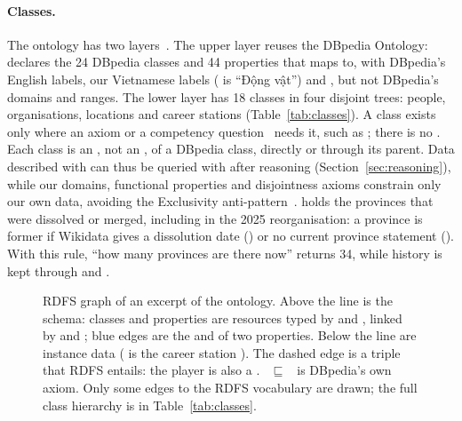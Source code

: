 \paragraph{Classes.} The ontology has two layers~\cite{heath2011linked}. The
upper layer reuses the DBpedia Ontology:  declares
the 24 DBpedia classes and 44 properties that  maps to, with
DBpedia's English labels, our Vietnamese labels ( is ``Động
vật'') and , but not DBpedia's domains and ranges.
The lower layer has 18  classes in four disjoint trees: people,
organisations, locations and career stations (Table~\ref{tab:classes}). A
 class exists only where an axiom or a competency
question~\cite{gruninger1995methodology} needs it, such as
; there is no . Each class is an
, not an , of a DBpedia class,
directly or through its parent. Data described with  can thus be
queried with  after reasoning (Section~\ref{sec:reasoning}), while
our domains, functional properties and disjointness axioms constrain only our
own data, avoiding the Exclusivity anti-pattern~\cite{paulheim2024modeling}.
 holds the
provinces that were dissolved or merged, including in the 2025 reorganisation:
a province is former if Wikidata gives a dissolution date () or no
current province statement (). With this rule, ``how many provinces are there now'' returns
34, while history is kept through  and
.

\begin{figure}[t]
\centering
\resizebox{\textwidth}{!}{}
\caption{RDFS graph of an excerpt of the ontology. Above the line is the
schema: classes and properties are resources typed by  and
, linked by  and
; blue edges are the  and
 of two properties. Below the line are instance data
( is the career station ).
The dashed edge is a triple that RDFS entails: the player is also a
. ~$\sqsubseteq$~ is DBpedia's own axiom. Only some  edges to the RDFS vocabulary are
drawn; the full class hierarchy is in Table~\ref{tab:classes}.}
\label{fig:rdfs}
\end{figure}

